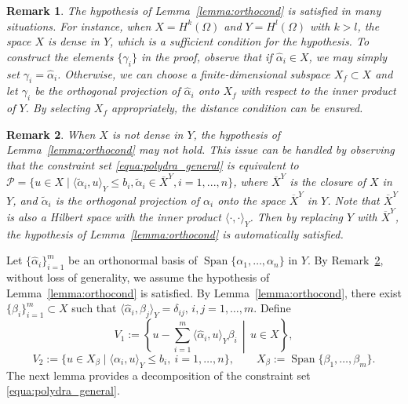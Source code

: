 \documentclass{article}
\numberwithin{equation}{section}
\newtheorem{remark}{Remark}[section]
\begin{document}
\begin{remark}
The hypothesis of Lemma~\ref{lemma:orthocond} is satisfied in many situations. For instance, when $X=H^k(\Omega)$ and $Y=H^l(\Omega)$ with $k>l$, the space $X$ is dense in $Y$, which is a sufficient condition for the hypothesis. To construct the elements $\{\gamma_i\}$ in the proof, observe that if $\hat{\alpha}_i\in X$, we may simply set $\gamma_i=\hat{\alpha}_i$. Otherwise, we can choose a finite-dimensional subspace $X_f\subset X$ and let $\gamma_i$ be the orthogonal projection of $\hat{\alpha}_i$ onto $X_f$ with respect to the inner product of $Y$. By selecting $X_f$ appropriately, the distance condition can be ensured.
\end{remark}

\begin{remark}\label{remark2}
    When $X$ is not dense in $Y$, the hypothesis of Lemma~\ref{lemma:orthocond} may not hold. This issue can be handled by observing that the constraint set \eqref{equa:polydra_general} is equivalent to 
 $\mathcal{P}=\{u\in X\mid \langle \tilde{\alpha}_i,u\rangle_Y \le b_i,\tilde{\alpha}_i\in \overline{X}^Y, i=1,...,n\}$,
where $\overline{X}^Y$ is the closure of $X$ in $Y$, and $\tilde{\alpha}_i$ is the orthogonal projection of $\alpha_i$ onto the space $\overline{X}^Y$ in $Y$. Note that $\overline{X}^Y$ is also a Hilbert space with the inner product $\langle\cdot,\cdot \rangle_{Y}$. Then by replacing $Y$ with $\overline{X}^Y$, the hypothesis of Lemma~\ref{lemma:orthocond} is automatically satisfied.
\end{remark}


Let $\{\hat{\alpha}_i\}_{i=1}^m$ be an orthonormal basis of $\operatorname{Span}\{\alpha_1,\dots,\alpha_n\}$ in $Y$. By Remark~\ref{remark2}, without loss of generality, we assume the hypothesis of Lemma~\ref{lemma:orthocond} is satisfied. By Lemma~\ref{lemma:orthocond}, there exist $\{\beta_i\}_{i=1}^m\subset X$ such that $ \langle \hat{\alpha}_i,\beta_j\rangle_Y=\delta_{ij},\, i,j=1,\dots,m.$ Define
\begin{equation}\label{equa:V1}
    V_1
    :=
    \left\{
    u-\sum_{i=1}^m \langle \hat{\alpha}_i,u\rangle_Y \beta_i
    \,\middle|\,
    u\in X
    \right\},
\end{equation}
\begin{equation}\label{equa:V2}
    V_2
    :=
    \{u\in X_\beta\mid \langle \alpha_i,u\rangle_Y\le b_i,\ i=1,\dots,n\},
    \qquad
    X_\beta:=\operatorname{Span}\{\beta_1,\dots,\beta_m\}.
\end{equation}
The next lemma provides a decomposition of the constraint set \eqref{equa:polydra_general}.
\end{document}
